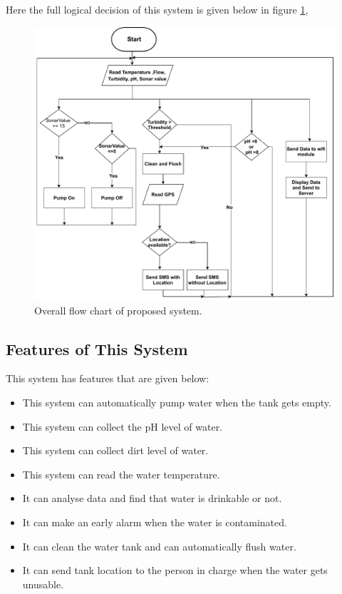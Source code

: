 Here the full logical decision of this system is given below in figure \ref{Flow},
\begin{figure}[H]
\centering
\includegraphics[width=1.0\textwidth]{figures/flow chat.pdf}
\caption{Overall flow chart of proposed system.}
\label{Flow}
\end{figure}
\subsection{Features of This System}
This system has features that are given below:
\begin{itemize}
\item This system can automatically pump water when the tank gets empty.
\item This system can collect the pH level of water.
\item This system can collect dirt level of water.
\item This system can read the water temperature.
\item It can analyse data and find that water is drinkable or not.
\item It can make an early alarm when the water is contaminated.
\item It can clean the water tank and can automatically flush water.
\item It can send tank location to the person in charge when the water gets unusable.
\end{itemize}

